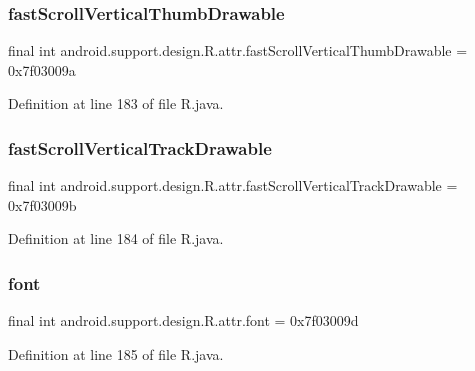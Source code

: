 \subsubsection{\texorpdfstring{fastScrollVerticalThumbDrawable}{fastScrollVerticalThumbDrawable}}
{\footnotesize\ttfamily final int android.\+support.\+design.\+R.\+attr.\+fast\+Scroll\+Vertical\+Thumb\+Drawable = 0x7f03009a\hspace{0.3cm}{\ttfamily [static]}}



Definition at line 183 of file R.\+java.

\mbox{\label{classandroid_1_1support_1_1design_1_1_r_1_1attr_a3c3952d5649ec718fd0d14de949a69eb}} 
\subsubsection{\texorpdfstring{fastScrollVerticalTrackDrawable}{fastScrollVerticalTrackDrawable}}
{\footnotesize\ttfamily final int android.\+support.\+design.\+R.\+attr.\+fast\+Scroll\+Vertical\+Track\+Drawable = 0x7f03009b\hspace{0.3cm}{\ttfamily [static]}}



Definition at line 184 of file R.\+java.

\mbox{\label{classandroid_1_1support_1_1design_1_1_r_1_1attr_ac64c32894b875c84fac5535fb0604ec6}} 
\subsubsection{\texorpdfstring{font}{font}}
{\footnotesize\ttfamily final int android.\+support.\+design.\+R.\+attr.\+font = 0x7f03009d\hspace{0.3cm}{\ttfamily [static]}}



Definition at line 185 of file R.\+java.

